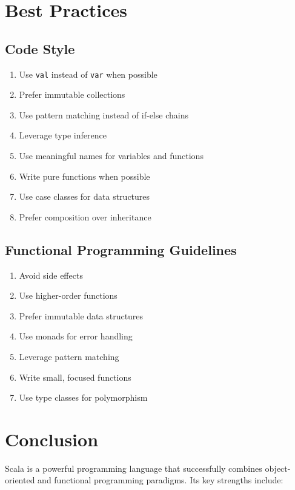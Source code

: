 \documentclass[11pt]{article}
\begin{document}
\section{Best Practices}

\subsection{Code Style}

\begin{enumerate}
    \item Use \texttt{val} instead of \texttt{var} when possible
    \item Prefer immutable collections
    \item Use pattern matching instead of if-else chains
    \item Leverage type inference
    \item Use meaningful names for variables and functions
    \item Write pure functions when possible
    \item Use case classes for data structures
    \item Prefer composition over inheritance
\end{enumerate}

\subsection{Functional Programming Guidelines}

\begin{enumerate}
    \item Avoid side effects
    \item Use higher-order functions
    \item Prefer immutable data structures
    \item Use monads for error handling
    \item Leverage pattern matching
    \item Write small, focused functions
    \item Use type classes for polymorphism
\end{enumerate}

\section{Conclusion}

Scala is a powerful programming language that successfully combines object-oriented and functional programming paradigms. Its key strengths include:
\end{document}
